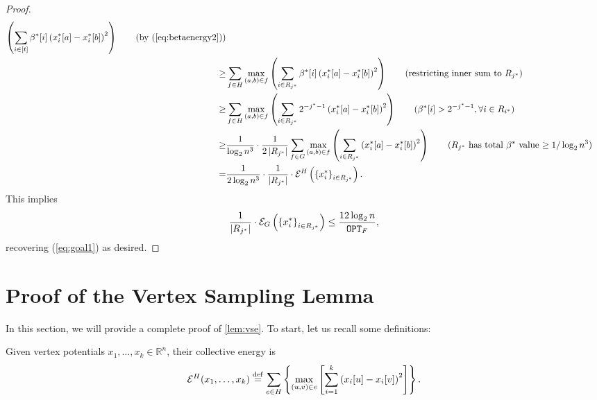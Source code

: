 \documentclass{article}
\begin{document}
\begin{proof}
\begin{align*}
        \left( \sum_{i\in[t]} \beta^*[i] \left(x_{i}^{*}[a] - x_{i}^{*}[b]\right)^2 \right) 
        \qquad \text{(by (\ref{eq:betaenergy2}))}
        \\
         \geq &
        \sum_{f\in H}
        \max_{(a,b)\in f}
        \left( \sum_{i\in R_{j^*}} \beta^*[i] \left(x_{i}^{*}[a] - x_{i}^{*}[b]\right)^2 \right)
        \qquad \text{(restricting inner sum to $R_{j^*}$)}
        \\
        \geq &
        \sum_{f\in H}
        \max_{(a,b)\in f}
        \left( \sum_{i\in R_{j^*}} 2^{-j^*-1} \left(x_{i}^{*}[a] - x_{i}^{*}[b]\right)^2 \right)
        \qquad \text{($\beta^*[i] > 2^{-j^*-1}, \forall i \in R_{i^*}$)}
        \\
        \geq & \frac{1}{\log_2 n^3} \cdot \frac{1}{2 \left|R_{j^*} \right|}
        \sum_{f\in G}
        \max_{(a,b)\in f}
        \left( \sum_{i\in R_{j^*}} \left(x_{i}^{*}[a] - x_{i}^{*}[b]\right)^2 \right)
        \qquad \text{($R_{j^*}$ has total $\beta^*$ value $\geq 1/\log_2 n^3$)}
        \\
        = & \frac{1}{2 \log_2 n^3} \cdot \frac{1}{\left|R_{j^*} \right|}
        \cdot \mathcal{E}^H\left(\left\{x_{i}^{*} \right\}_{i\in R_{j^*}}\right).
    \end{align*}
    This implies
    \begin{align*}
        \frac{1}{\left|R_{j^*} \right|}
        \cdot \mathcal{E}_G\left(\left\{x_{i}^{*} \right\}_{i\in R_{j^*}}\right) \leq
        \frac{12 \log_2 n}{\mathtt{OPT}_F},
    \end{align*}
    recovering (\ref{eq:goal1}) as desired.
\end{proof}

\section{Proof of the Vertex Sampling Lemma}\label{sec:pflemvse}

In this section, we will provide a complete proof of \cref{lem:vse}. To start, let us recall some definitions:


\begin{definition}
    Given vertex potentials $x_1,\ldots,x_k\in\mathbb{R}^{n}$,
    their collective energy is
    \begin{align*}
        \mathcal{E}^H(x_1,\ldots,x_k) \stackrel{\mathrm{def}}{=}
        \sum_{e\in H}
        \left\{\max_{(u,v)\in e} \left[
        \sum_{i=1}^{k} \left(x_i[u] - x_i[v]\right)^2
        \right]  \right\}.
    \end{align*}
\end{definition}
\end{document}
